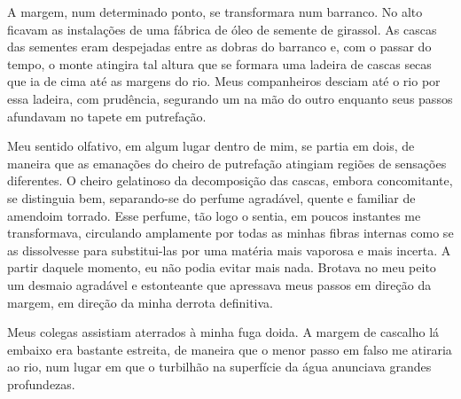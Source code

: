 A margem, num determinado ponto, se transformara num barranco. No alto ficavam
as instalações de uma fábrica de óleo de semente de girassol. As cascas das
sementes eram despejadas entre as dobras do barranco e, com o passar do
tempo, o monte atingira tal altura que se formara uma ladeira de cascas secas
que ia de cima até as margens do rio. Meus companheiros desciam até o rio por
essa ladeira, com prudência, segurando um na mão do outro enquanto seus
passos afundavam no tapete em putrefação.



Meu sentido olfativo, em algum lugar dentro de mim, se partia em dois, de
maneira que as emanações do cheiro de putrefação atingiam regiões de
sensações diferentes. O cheiro gelatinoso da decomposição das cascas, embora
concomitante, se distinguia bem, separando-se do perfume agradável, quente e
familiar de amendoim torrado. Esse perfume, tão logo o sentia, em poucos
instantes me transformava, circulando amplamente por todas as minhas fibras
internas como se as dissolvesse para substitui-las por uma matéria mais
vaporosa e mais incerta. A partir daquele momento, eu não podia evitar mais
nada. Brotava no meu peito um desmaio agradável e estonteante que apressava
meus passos em direção da margem, em direção da minha derrota definitiva.


Meus colegas assistiam aterrados à minha fuga doida. A margem de cascalho lá
embaixo era bastante estreita, de maneira que o menor passo em falso me
atiraria ao rio, num lugar em que o turbilhão na superfície da água anunciava
grandes profundezas.


